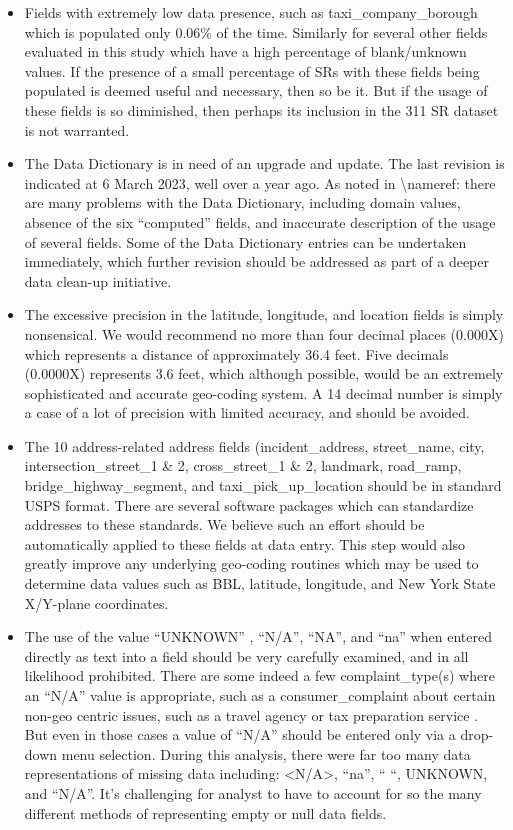 \documentclass[12pt, titlepage]{article}
\begin{document}
{\begin{itemize}
	\item Fields with extremely low data presence, such as taxi\_company\_borough which is populated only 0.06\% of the time. Similarly for several other fields 
	evaluated in this study which have a high percentage of blank/unknown values. If the presence of a small percentage of SRs 
	with these fields being populated is deemed useful and necessary, then so be it. But if the usage of these fields is so diminished, 
	then perhaps its inclusion in the 311 SR dataset is not warranted.
	
	\item The Data Dictionary is in need of an upgrade and update. The last revision is indicated at 6 March 2023, well over a year ago. 
	As noted in \textbackslash nameref:  there are many problems with the Data Dictionary, including domain
	values, absence of the six ``computed'' fields, and inaccurate description of the usage of several fields. Some of the Data Dictionary
	entries can be undertaken immediately, which further revision should be addressed as part of a deeper data clean-up initiative. 
	
	\item The excessive precision in the latitude, longitude, and location fields is simply nonsensical.  We would recommend no more than four
	decimal places (0.000X) which represents a distance of approximately 36.4 feet. Five decimals (0.0000X) represents 3.6 feet, which 
	although possible, would be an extremely sophisticated and accurate geo-coding system. A 14 decimal number is simply a case
	of a lot of precision with limited accuracy, and should be avoided.

	\item The 10 address-related address fields (incident\_address, street\_name, city, intersection\_street\_1 \& 2, cross\_street\_1 \& 2,  landmark,
	road\_ramp, bridge\_highway\_segment, and taxi\_pick\_up\_location should be in standard USPS format. 
	There are several software packages which can standardize addresses to these standards.
	We believe such an effort should be automatically applied to these fields at data entry. This step would also greatly improve any underlying geo-coding routines which
	may be used to determine data values such as BBL, latitude, longitude, and New York State X/Y-plane coordinates.
	
	\item The use of the value ``UNKNOWN'' , ``N/A'', ``NA'', and ``na'' when entered directly as text into a field should be very carefully examined, and
	in all likelihood prohibited.  There are some indeed a few complaint\_type(s) where an ``N/A'' value is appropriate, such as a consumer\_complaint
	about certain non-geo centric issues, such as a travel agency or tax preparation service . But even in those cases a value of ``N/A'' should be 
	entered only via a drop-down menu selection. During this analysis, there were far too many data representations of missing data including: <N/A>, ``na'', `` ``,
	UNKNOWN, and ``N/A''. It's challenging for analyst to have to account for so the many different methods of representing empty or null data fields. 
	

\end{itemize}}
\end{document}
